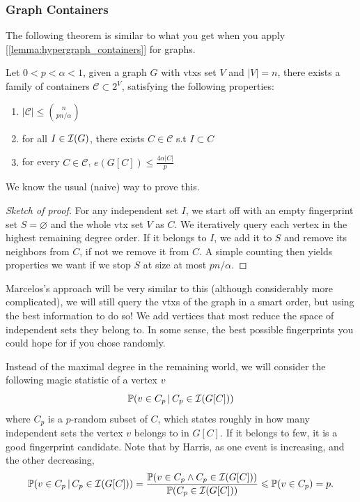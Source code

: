 \subsubsection{Graph Containers}
The following theorem is similar to what you get when you apply
[\ref{lemma:hypergraph_containers}] for graphs.
\begin{theorem} 
	\label{trm:graph_containers}
	Let $0 < p < \alpha < 1$, given a graph $G$ with vtxs set $V$ and
	$|V| = n$, there exists a family of containers
	$\mathcal{C} \subset 2^V$, satisfying the following properties:
	\begin{enumerate}[label=(\roman*)]
		\item $|\mathcal{C}| \leq \binom{n}{pn/\alpha}$
		\item for all $I \in \mathcal{I}(G)$, there exists $C \in
			\mathcal{C}$ s.t $I \subset C$
		\item for every $C \in \mathcal{C}$, $e(G[C]) \leq \frac{4\alpha|C|}{p}$
	\end{enumerate}
\end{theorem}

We know the usual (naive) way to prove this.
\begin{proof}[Sketch of proof]
	For any independent set $I$, we start off with an empty fingerprint
	set $S = \varnothing$ and the whole vtx set $V$ as $C$.
	We iteratively query each vertex in the highest remaining degree
	order. If it belongs to $I$,  we add it to $S$ and remove its
	neighbors from $C$,
	if not we remove it from $C$. A simple counting then yields
	properties we want if we stop $S$ at size at most
	$pn/\alpha$.
\end{proof}

Marcelos's approach will be very similar to this (although
considerably more complicated), we will still query the vtxs of the graph
in a smart order, but using the best information to do so! We add
vertices that most reduce the space
of independent sets they belong to. In some sense, the best possible
fingerprints you could hope for if you chose randomly.

Instead of the maximal degree in the remaining world, we will
consider the following magic statistic of a vertex $v$
\[
	\mathbb{P}(v \in C_p \,| \,C_p \in \mathcal{I}(G[C]))
\]
where $C_p$ is a $p$-random subset of $C$, which states roughly in
how many independent sets the vertex $v$ belongs to in $G[C]$. If it
belongs to few, it is
a good fingerprint candidate. Note that by Harris, as one event is
increasing, and the other decreasing,
\[
	\mathbb{P}(v \in C_p \,| \,C_p \in \mathcal{I}(G[C])) = \frac{\mathbb{P}(v \in C_p
	\land C_p \in \mathcal{I}(G[C]))}{\mathbb{P}(C_p \in \mathcal{I}(G[C]))}
	\leqslant \mathbb{P}(v \in C_p) = p.
\]

